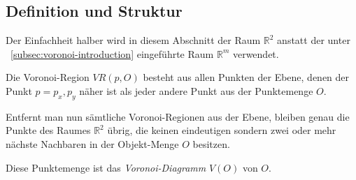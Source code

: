 \subsection{Definition und Struktur}

Der Einfachheit halber wird in diesem Abschnitt der Raum $\mathbb{R}^2$ anstatt der unter ~\ref{subsec:voronoi-introduction} eingeführte Raum $\mathbb{R}^m$ verwendet.

Die Voronoi-Region $VR(p, O)$ besteht aus allen Punkten der Ebene, denen der Punkt $p = {p_x, p_y}$ näher ist als jeder andere Punkt aus der Punktemenge $O$.

Entfernt man nun sämtliche Voronoi-Regionen aus der Ebene, bleiben genau die Punkte des Raumes $\mathbb{R}^2$ übrig, die keinen eindeutigen sondern zwei oder mehr nächste Nachbaren in der Objekt-Menge $O$ besitzen.

Diese Punktemenge ist das \textit{Voronoi-Diagramm} $V(O)$ von $O$. \parencite{klein2005algorithmischegeometrie}
